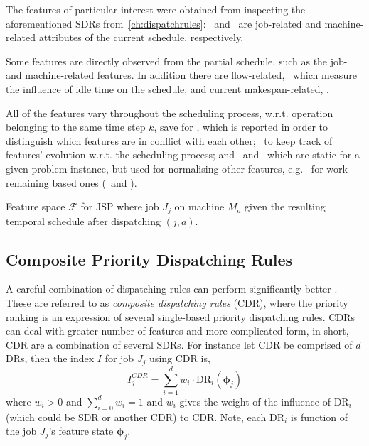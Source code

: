 \documentclass[smallextended]{svjour3}
\renewcommand{\vphi}{\bm \phi}
\begin{document}
The features of particular interest were obtained from inspecting the aforementioned SDRs from~\cref{ch:dispatchrules}:  
\phiJobRelated\ and \phiMacRelated\ are job-related and machine-related attributes of the current schedule, respectively. 

Some features are directly observed from the partial schedule, such as the job- and machine-related features. 
In addition there are 
flow-related, \phiFlowRelated\, which measure the influence of idle time on the schedule, 
and current makespan-related, \phiScheduleRelated.

All of the features vary throughout the scheduling process, w.r.t. operation belonging to the same time step $k$, save for \phimac, 
which is reported in order to distinguish which features are in conflict with each other; \phistep\ to keep track of features' evolution w.r.t. the scheduling process; and \phitotalProc\ and \phiwrmTotal\ which are static for a given problem instance, but used for normalising other features, e.g. \phiwrmTotal\ for  work-remaining based ones (\phiwrmJob\ and \phiwrmMac). 

\begin{table}[t]  \centering
  \caption[Feature space $\mathcal{F}$ for JSP]{Feature space $\mathcal{F}$ for JSP where job $J_j$ on machine $M_a$ given the resulting temporal schedule after dispatching $(j,a)$.
  }
  \label{tbl:jssp:feat}
  
\end{table}

\subsection{Composite Priority Dispatching Rules}\label{sec:CDR}
A careful combination of dispatching rules can perform significantly better \cite{Jayamohan04}. These are referred to as \emph{composite dispatching rules} (CDR), where the priority ranking is an expression of several single-based priority dispatching rules. CDRs can deal with greater number of features and more complicated form, in short, CDR are a combination of several SDRs. For instance let CDR be comprised of $d$ DRs, then the index $I$ for job $J_j$ using CDR is, 
\begin{equation}
I_j^{CDR} = \sum_{i=1}^d w_i \cdot \text{DR}_i(\vphi_j) \label{eq:CDR}
\end{equation}
where $w_i>0$ and $\sum_{i=0}^d w_i = 1$ and $w_i$ gives the weight of the influence of $\text{DR}_i$ (which could be SDR or another CDR) to CDR. Note, each $\text{DR}_i$ is function of the job $J_j$'s feature state $\vphi_j$.
\end{document}
